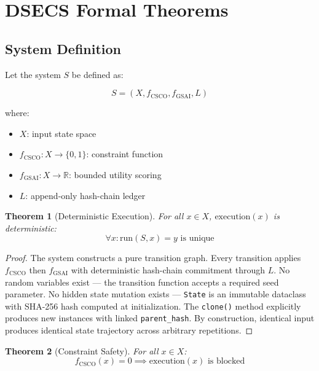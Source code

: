 
\section{DSECS Formal Theorems}

\subsection{System Definition}

Let the system $S$ be defined as:

\[
S = (X, f_{\text{CSCO}}, f_{\text{GSAI}}, L)
\]

where:

\begin{itemize}
    \item $X$: input state space
    \item $f_{\text{CSCO}}: X \to \{0, 1\}$: constraint function
    \item $f_{\text{GSAI}}: X \to \mathbb{R}$: bounded utility scoring
    \item $L$: append-only hash-chain ledger
\end{itemize}

\newtheorem{theorem}{Theorem}
\newtheorem{corollary}{Corollary}
\newtheorem{lemma}{Lemma}

\begin{theorem}[Deterministic Execution]
\label{thm:determinism}
For all $x \in X$, $\text{execution}(x)$ is deterministic:
\[
\forall x: \text{run}(S, x) = y \text{ is unique}
\]
\end{theorem}

\begin{proof}
The system constructs a pure transition graph. Every transition applies $f_{\text{CSCO}}$ then $f_{\text{GSAI}}$ with deterministic hash-chain commitment through $L$. No random variables exist — the transition function accepts a required seed parameter. No hidden state mutation exists — \texttt{State} is an immutable dataclass with SHA-256 hash computed at initialization. The \texttt{clone()} method explicitly produces new instances with linked \texttt{parent\_hash}. By construction, identical input produces identical state trajectory across arbitrary repetitions. \end{proof}

\begin{theorem}[Constraint Safety]
\label{thm:safety}
For all $x \in X$:
\[
f_{\text{CSCO}}(x) = 0 \implies \text{execution}(x) \text{ is blocked}
\]
\end{theorem}

